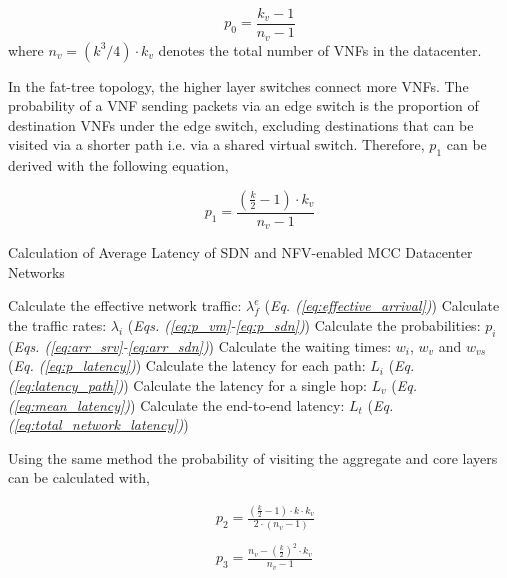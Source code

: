 \begin{equation}
    \label{eq:p_vm}
    p_{0} = \frac{k_{v} - 1}{n_v - 1}
\end{equation}
\noindent where $n_v = (k^3/4)\cdot k_v$ denotes the total number of VNFs in the datacenter.

In the fat-tree topology, the higher layer switches connect more VNFs. The probability of a VNF sending packets via an edge switch is the proportion of destination VNFs under the edge switch, excluding destinations that can be visited via a shorter path i.e. via a shared virtual switch. Therefore, $p_1$ can be derived with the following equation,

\begin{equation}
    \label{eq:p_edge}
    p_{1} = \frac{\left(\frac{k}{2}-1\right) \cdot k_v}{n_v - 1}
\end{equation}

\begin{algorithm}[t]

    \caption{Calculation of Average Latency of SDN and NFV-enabled MCC Datacenter Networks}
    \label{alg:avg_latency_final}

    \begin{algorithmic}[1]
        \STATE Calculate the effective network traffic: $\lambda_f^e$ \hfill(\textit{Eq. (\ref{eq:effective_arrival})})
        \STATE Calculate the traffic rates: $\lambda_i$ \hfill(\textit{Eqs. (\ref{eq:p_vm}-\ref{eq:p_sdn})})
        \STATE Calculate the probabilities: $p_i$ \hfill(\textit{Eqs. (\ref{eq:arr_srv}-\ref{eq:arr_sdn})})
        \STATE Calculate the waiting times: $w_i$, $w_v$ and $w_{vs}$ \hfill(\textit{Eq. (\ref{eq:p_latency})})
        \STATE Calculate the latency for each path: $L_i$ \hfill (\textit{Eq. (\ref{eq:latency_path})})
        \STATE Calculate the latency for a single hop: $L_v$ \hfill (\textit{Eq. (\ref{eq:mean_latency})})
        \STATE Calculate the end-to-end latency: $L_t$ \hfill (\textit{Eq. (\ref{eq:total_network_latency})})
    \end{algorithmic}
\end{algorithm}


Using the same method the probability of visiting the aggregate and core layers can be calculated with,

\begin{align}
    \label{eq:p_agg_core}
     & p_{2} = \frac{\left(\frac{k}{2}-1\right)\cdot k \cdot k_v }{2 \cdot (n_v-1) } \\ \nonumber \\
     & p_{3} = \frac{n_v - \left(\frac{k}{2}\right)^2 \cdot k_{v}}{n_v - 1}
\end{align}

